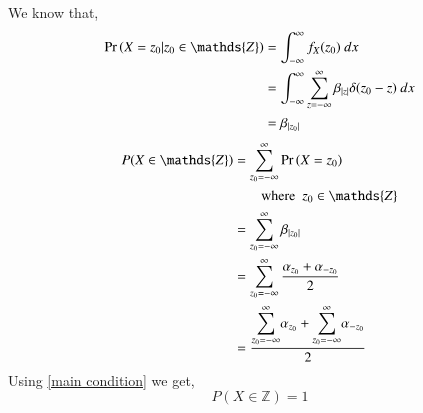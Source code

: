 \documentclass[journal,12pt,twocolumn]{IEEEtran}
\begin{document}
  We know that,
  \begin{align}
      \pr{X=z_0|z_0 \in \mathds{Z}}&=\int_{-\infty}^{\infty} f_X(z_0)~dx\\
      &=\int_{-\infty}^{\infty}\sum_{z=-\infty}^{\infty}\beta_{|z|}\delta(z_0-z)~dx\\
      &=\beta_{|z_0|}
  \end{align}
  \begin{align}
      P(X \in \mathds{Z})&=\sum_{z_0=-\infty}^{\infty}\pr{X=z_0}\nonumber\\&~~~~~~~~\text{where~~} z_0 \in \mathds{Z}\\
      &=\sum_{z_0=-\infty}^{\infty}\beta_{|z_0|}\\
      &=\sum_{z_0=-\infty}^{\infty}\dfrac{\alpha_{z_0}+\alpha_{-z_0}}{2}\\
      &=\dfrac{\mathlarger{\sum}_{z_0=-\infty}^{\infty}\alpha_{z_0}+\mathlarger{\sum}_{z_0=-\infty}^{\infty}\alpha_{-z_0}}{2}
  \end{align}
  Using \eqref{main condition} we get,
  $$ P(X \in \mathds{Z})=1$$
\end{document}

